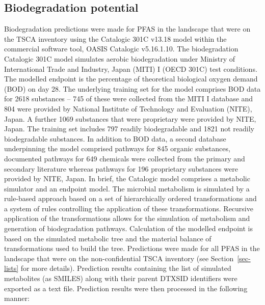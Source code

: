 \documentclass[
  super,
  preprint,
  3p]{elsarticle}
\begin{document}
\hypertarget{biodegradation-potential}{%
\subsection{Biodegradation potential}\label{biodegradation-potential}}

Biodegradation predictions were made for PFAS in the landscape that were
on the TSCA inventory using the Catalogic 301C v13.18 model within the
commercial software tool, OASIS Catalogic v5.16.1.10. The biodegradation
Catalogic 301C model simulates aerobic biodegradation under Ministry of
International Trade and Industry, Japan (MITI) I (OECD 301C) test
conditions. The modelled endpoint is the percentage of theoretical
biological oxygen demand (BOD) on day 28. The underlying training set
for the model comprises BOD data for 2618 substances -- 745 of these
were collected from the MITI I database and 804 were provided by
National Institute of Technology and Evaluation (NITE), Japan. A further
1069 substances that were proprietary were provided by NITE, Japan. The
training set includes 797 readily biodegradable and 1821 not readily
biodegradable substances. In addition to BOD data, a second database
underpinning the model comprised pathways for 845 organic substances,
documented pathways for 649 chemicals were collected from the primary
and secondary literature whereas pathways for 196 proprietary substances
were provided by NITE, Japan. In brief, the Catalogic model comprises a
metabolic simulator and an endpoint model. The microbial metabolism is
simulated by a rule-based approach based on a set of hierarchically
ordered transformations and a system of rules controlling the
application of these transformations. Recursive application of the
transformations allows for the simulation of metabolism and generation
of biodegradation pathways. Calculation of the modelled endpoint is
based on the simulated metabolic tree and the material balance of
transformations used to build the tree. Predictions were made for all
PFAS in the landscape that were on the non-confidential TSCA inventory
(see Section~\ref{sec-lists} for more details). Prediction results
containing the list of simulated metabolites (as SMILES) along with
their parent DTXSID identifiers were exported as a text file. Prediction
results were then processed in the following manner:
\end{document}
